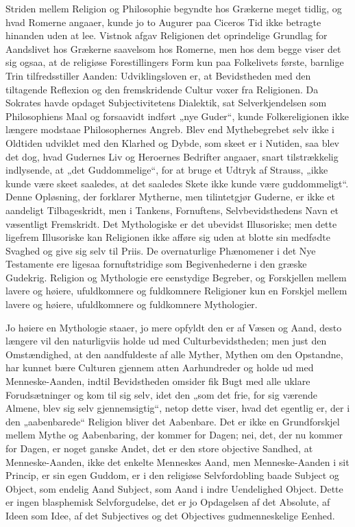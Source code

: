 \documentclass[12pt]{book}
\begin{document}
Striden mellem Religion og Philosophie begyndte hos Grækerne meget
tidlig, og hvad Romerne angaaer, kunde jo to Augurer paa Ciceros Tid
ikke betragte hinanden uden at lee. Vistnok afgav Religionen det
oprindelige Grundlag for Aandslivet hos Grækerne saavelsom hos
Romerne, men hos dem begge viser det sig ogsaa, at de religiøse
Forestillingers Form kun paa Folkelivets første, barnlige Trin
tilfredsstiller Aanden: Udviklingsloven er, at Bevidstheden med den
tiltagende Reflexion og den fremskridende Cultur voxer fra
Religionen. Da Sokrates havde opdaget Subjectivitetens Dialektik,
sat Selverkjendelsen som Philosophiens Maal og forsaavidt indført
„nye Guder“, kunde Folkereligionen ikke længere modstaae
Philosophernes Angreb. Blev end Mythebegrebet selv ikke i Oldtiden
udviklet med den Klarhed og Dybde, som skeet er i Nutiden, saa blev
det dog, hvad Gudernes Liv og Heroernes Bedrifter angaaer, snart
tilstrækkelig indlysende, at „det Guddommelige“, for at bruge et
Udtryk af Strauss, „ikke kunde være skeet saaledes, at det saaledes
Skete ikke kunde være guddommeligt“. Denne Opløsning, der forklarer
Mytherne, men tilintetgjør Guderne, er ikke et aandeligt
Tilbageskridt, men i Tankens, Fornuftens, Selvbevidsthedens Navn et
væsentligt Fremskridt. Det Mythologiske er det ubevidst Illusoriske;
men dette ligefrem Illusoriske kan Religionen ikke afføre sig uden
at blotte sin medfødte Svaghed og give sig selv til Priis. De
overnaturlige Phænomener i det Nye Testamente ere ligesaa
fornuftstridige som Begivenhederne i den græske Gudekrig. Religion
og Mythologie ere eenstydige Begreber, og Forskjellen mellem lavere
og
høiere, ufuldkomnere og fuldkomnere Religioner kun en Forskjel
mellem lavere og høiere, ufuldkomnere og fuldkomnere Mythologier.

Jo høiere en Mythologie staaer, jo mere opfyldt den er af Væsen og
Aand, desto længere vil den naturligviis holde ud med
Culturbevidstheden; men just den Omstændighed, at den aandfuldeste
af alle Myther, Mythen om den Opstandne, har kunnet bære Culturen
gjennem atten Aarhundreder og holde ud med Menneske-Aanden, indtil
Bevidstheden omsider fik Bugt med alle uklare Forudsætninger og kom
til sig selv, idet den „som det frie, for sig værende Almene, blev
sig selv gjennemsigtig“, netop dette viser, hvad det egentlig er,
der i den „aabenbarede“ Religion bliver det Aabenbare. Det er ikke
en Grundforskjel mellem Mythe og Aabenbaring, der kommer for Dagen;
nei, det, der nu kommer for Dagen, er noget ganske Andet, det er den
store objective Sandhed, at Menneske-Aanden, ikke det enkelte
Menneskes Aand, men Menneske-Aanden i sit Princip, er sin egen
Guddom, er i den religiøse Selvfordobling baade Subject og Object,
som endelig Aand Subject, som Aand i indre Uendelighed Object. Dette
er ingen blasphemisk Selvforgudelse, det er jo Opdagelsen af det
Absolute, af Ideen som Idee, af det Subjectives og det Objectives
gudmenneskelige Eenhed.
\end{document}
